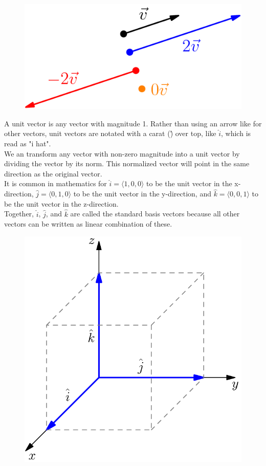 \begin{figure}[h]
	\centering
	\includegraphics[scale=0.5]{Images/backgroundReview/ScalarMultiples}
\end{figure}

\noindent
A unit vector is any vector with magnitude 1. Rather than using an arrow like for other vectors, unit vectors are notated with a carat (\^) over top, like $\hat{i}$, which is read as "i hat".\\
We an transform any vector with non-zero magnitude into a unit vector by dividing the vector by its norm. This normalized vector will point in the same direction as the original vector.\\

\noindent
It is common in mathematics for $\hat{i} = \langle 1,0,0 \rangle$ to be the unit vector in the x-direction, $\hat{j} = \langle 0,1,0 \rangle$ to be the unit vector in the y-direction, and $\hat{k} = \langle 0,0,1 \rangle$ to be the unit vector in the z-direction.\\
Together, $\hat{i}$, $\hat{j}$, and $\hat{k}$ are called the standard basis vectors because all other vectors can be written as linear combination of these.

\begin{figure}[h]
	\centering
	\includegraphics[scale=0.33]{Images/backgroundReview/UnitVectors}
\end{figure}

